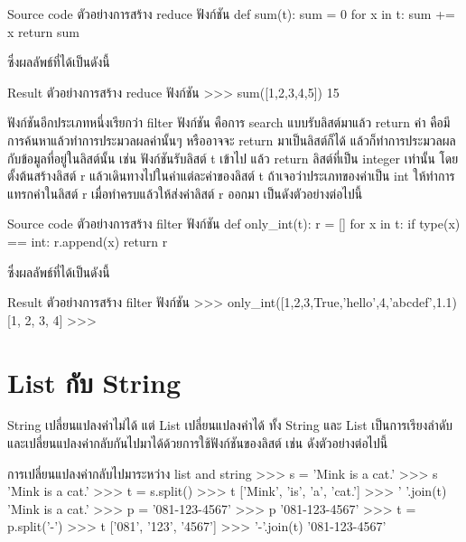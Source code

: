 \begin{codelist}{Source code ตัวอย่างการสร้าง reduce ฟังก์ชัน}{}
def sum(t):
    sum = 0
    for x in t: sum += x
    return sum
\end{codelist}

ซึ่งผลลัพธ์ที่ได้เป็นดังนี้

\begin{codelist}{Result ตัวอย่างการสร้าง reduce ฟังก์ชัน}{}
>>> sum([1,2,3,4,5])
15
\end{codelist}


ฟังก์ชันอีกประเภทหนึ่งเรียกว่า filter ฟังก์ชัน คือการ search แบบรับลิสต์มาแล้ว return ค่า คือมีการค้นหาแล้วทำการประมวลผลค่านั้นๆ หรืออาจจะ return มาเป็นลิสต์ก็ได้ แล้วก็ทำการประมวลผลกับข้อมูลที่อยู่ในลิสต์นั้น เช่น ฟังก์ชันรับลิสต์ t เข้าไป แล้ว return ลิสต์ที่เป็น integer เท่านั้น โดยตั้งต้นสร้างลิสต์ r แล้วเดินทางไปในค่าแต่ละค่าของลิสต์ t ถ้าเจอว่าประเภทของค่าเป็น int ให้ทำการแทรกค่าในลิสต์ r เมื่อทำครบแล้วให้ส่งค่าลิสต์ r ออกมา เป็นดังตัวอย่างต่อไปนี้

\begin{codelist}{Source code ตัวอย่างการสร้าง filter ฟังก์ชัน}{}
def only_int(t):
    r = []
    for x in t:
        if type(x) == int: r.append(x)
    return r
\end{codelist}

ซึ่งผลลัพธ์ที่ได้เป็นดังนี้

\begin{codelist}{Result ตัวอย่างการสร้าง filter ฟังก์ชัน}{}
>>> only_int([1,2,3,True,'hello',4,'abcdef',1.1)
[1, 2, 3, 4]
>>>
\end{codelist}

\section{List กับ String}

String เปลี่ยนแปลงค่าไม่ได้ แต่ List เปลี่ยนแปลงค่าได้ ทั้ง String และ List เป็นการเรียงลำดับและเปลี่ยนแปลงค่ากลับกันไปมาได้ด้วยการใช้ฟังก์ชันของลิสต์ เช่น  ดังตัวอย่างต่อไปนี้

\begin{codelist}{การเปลี่ยนแปลงค่ากลับไปมาระหว่าง list and string}{}
>>> s = 'Mink is a cat.'
>>> s
'Mink is a cat.'
>>> t = s.split()
>>> t
['Mink', 'is', 'a', 'cat.']
>>> ' '.join(t)
'Mink is a cat.'
>>> p = '081-123-4567'
>>> p
'081-123-4567'
>>> t = p.split('-')
>>> t
['081', '123', '4567']
>>> '-'.join(t)
'081-123-4567'
\end{codelist}


